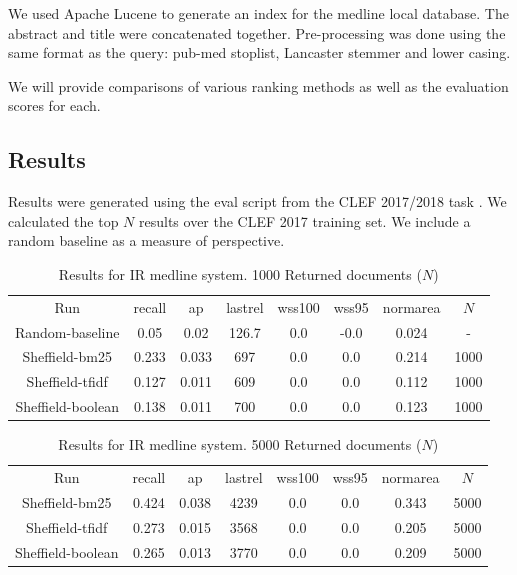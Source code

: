 We used Apache Lucene to generate an index for the medline local database. The abstract and title were concatenated together. Pre-processing was done using the same format as the query: pub-med stoplist, Lancaster stemmer and lower casing. 

We will provide comparisons of various ranking methods as well as the evaluation scores for each. 

\subsection{Results}

Results were generated using the eval script from the CLEF 2017/2018 task \cite{Kanoulas12017}. We calculated the top $N$ results over the CLEF 2017 training set. We include a random baseline as a measure of perspective.


\begin{table}[H]
\centering
\begin{tabular}{|c|c|c|c|c|c|c|c|} 
 \hline
 Run & recall &  ap & lastrel & wss100 & wss95 & normarea & $N$ \\ 
 Random-baseline & 0.05 &0.02 & 126.7 &0.0 &-0.0 & 0.024 & - \\
  Sheffield-bm25 & 0.233 &0.033 & 697 &0.0 &0.0 & 0.214 & 1000 \\
  Sheffield-tfidf & 0.127 &0.011 & 609 &0.0 &0.0 & 0.112 & 1000 \\
  Sheffield-boolean & 0.138 &0.011 & 700 &0.0 &0.0 & 0.123 & 1000 \\
 \hline
\end{tabular}
\caption{Results for IR medline system. 1000 Returned documents ($N$)}
\end{table}


\begin{table}[H]
\centering
\begin{tabular}{|c|c|c|c|c|c|c|c|} 
 \hline
 Run & recall &  ap & lastrel & wss100 & wss95 & normarea & $N$ \\ 
  Sheffield-bm25 & 0.424 &0.038 & 4239 &0.0 &0.0 & 0.343 & 5000 \\
  Sheffield-tfidf & 0.273 &0.015 & 3568 &0.0 &0.0 & 0.205 & 5000 \\
  Sheffield-boolean & 0.265 &0.013 & 3770 &0.0 &0.0 & 0.209 & 5000 \\
 \hline
\end{tabular}
\caption{Results for IR medline system. 5000 Returned documents ($N$)}
\end{table}

